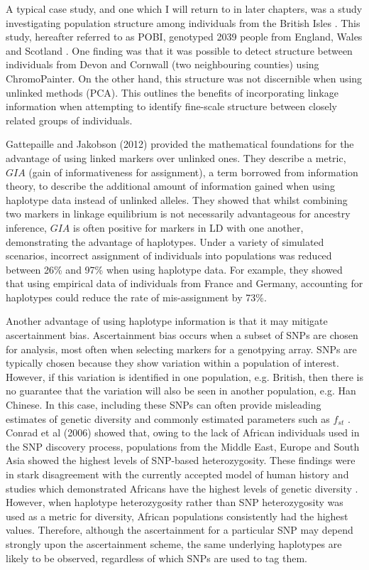 A typical case study, and one which I will return to in later chapters, was a study investigating population structure among individuals from the British Isles \cite{Leslie2015}. This study, hereafter referred to as POBI, genotyped 2039 people from England, Wales and Scotland \cite{Leslie2015}. One finding was that it was possible to detect structure between individuals from Devon and Cornwall (two neighbouring counties) using ChromoPainter. On the other hand, this structure was not discernible when using unlinked methods (PCA). This outlines the benefits of incorporating linkage information when attempting to identify fine-scale structure between closely related groups of individuals.

Gattepaille and Jakobson (2012) \cite{JakobssonCombiningMarkers} provided the mathematical foundations for the advantage of using linked markers over unlinked ones. They describe a metric, $GIA$ (gain of informativeness for assignment), a term borrowed from information theory, to describe the additional amount of information gained when using haplotype data instead of unlinked alleles. They showed that whilst combining two markers in linkage equilibrium is not necessarily advantageous for ancestry inference, $GIA$ is often positive for markers in LD with one another, demonstrating the advantage of haplotypes. Under a variety of simulated scenarios, incorrect assignment of individuals into populations was reduced between 26\% and 97\% when using haplotype data. For example, they showed that using empirical data of individuals from France and Germany, accounting for haplotypes could reduce the rate of mis-assignment by 73\%. 

Another advantage of using haplotype information is that it may mitigate ascertainment bias. Ascertainment bias occurs when a subset of SNPs are chosen for analysis, most often when selecting markers for a genotpying array. SNPs are typically chosen because they show variation within a population of interest. However, if this variation is identified in one population, e.g. British, then there is no guarantee that the variation will also be seen in another population, e.g. Han Chinese. In this case, including these SNPs can often provide misleading estimates of genetic diversity and commonly estimated parameters such as $f_{st}$ \cite{BergstromHGDP}. Conrad et al (2006) showed that, owing to the lack of African individuals used in the SNP discovery process, populations from the Middle East, Europe and South Asia showed the highest levels of SNP-based heterozygosity. These findings were in stark disagreement with the currently accepted model of human history and studies which demonstrated Africans have the highest levels of genetic diversity \cite{cann1987mitochondrial, rosenberg2002genetic, ramachandran2005support, bowcock1994high, hellenthal2008inferring}. However, when haplotype heterozygosity rather than SNP heterozygosity was used as a metric for diversity, African populations consistently had the highest values. Therefore, although the ascertainment for a particular SNP may depend strongly upon the ascertainment scheme, the same underlying haplotypes are likely to be observed, regardless of which SNPs are used to tag them. 

